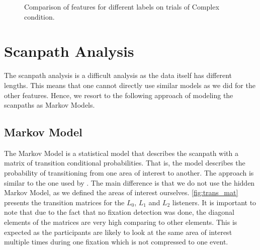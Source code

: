 \begin{figure}
\begin{floatrow}
{    \caption{Comparison of features for different labels on trials of Complex condition.}
    \label{fig:barchart_complex}
}
\end{floatrow}
\begin{floatrow}
\end{floatrow}
\end{figure}



\section{Scanpath Analysis}
\label{sec:scanpath_analysis}
The scanpath analysis is a difficult analysis as the data itself has different lengths. This means that one cannot directly use similar models as we did for the other features. Hence, we resort to the following approach of modeling the scanpaths as Markov Models.


\subsection{Markov Model}
\label{sec:markov_model}
The Markov Model is a statistical model that describes the scanpath with a matrix of transition conditional probabilities. That is, the model describes the probability of transitioning from one area of interest to another. The approach is similar to the one used by \cite{Coutrot_2018}. The main difference is that we do not use the hidden Markov Model, as we defined the areas of interest ourselves. \autoref{fig:trans_mat} presents the transition matrices for the $L_0$, $L_1$ and $L_2$ listeners. It is important to note that due to the fact that no fixation detection was done, the diagonal elements of the matrices are very high comparing to other elements. This is expected as the participants are likely to look at the same area of interest multiple times during one fixation which is not compressed to one event. 

